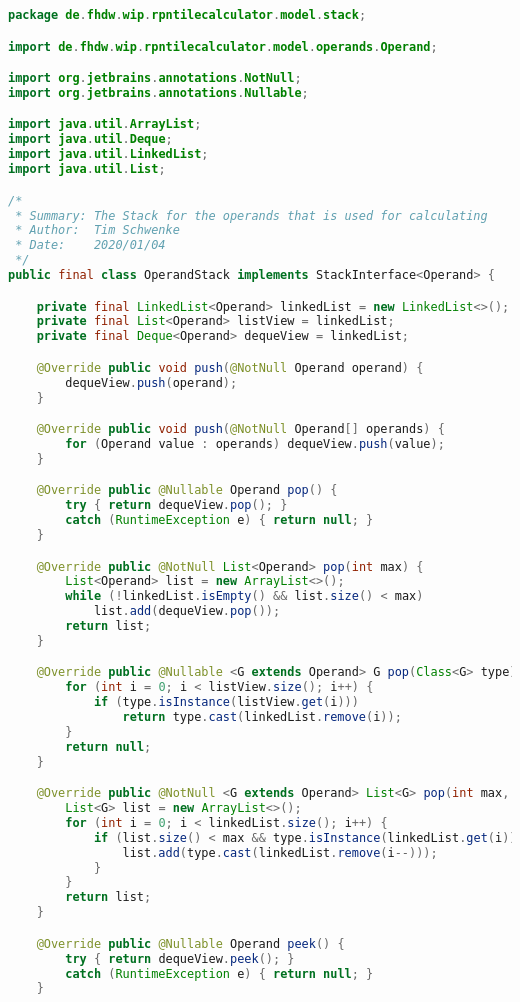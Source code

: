 \begin{lstlisting}[caption=OperandStack (Schwenke),label=list:OperandStack,language=Java]
package de.fhdw.wip.rpntilecalculator.model.stack;

import de.fhdw.wip.rpntilecalculator.model.operands.Operand;

import org.jetbrains.annotations.NotNull;
import org.jetbrains.annotations.Nullable;

import java.util.ArrayList;
import java.util.Deque;
import java.util.LinkedList;
import java.util.List;

/*
 * Summary: The Stack for the operands that is used for calculating
 * Author:  Tim Schwenke
 * Date:    2020/01/04
 */
public final class OperandStack implements StackInterface<Operand> {

    private final LinkedList<Operand> linkedList = new LinkedList<>();
    private final List<Operand> listView = linkedList;
    private final Deque<Operand> dequeView = linkedList;

    @Override public void push(@NotNull Operand operand) {
        dequeView.push(operand);
    }

    @Override public void push(@NotNull Operand[] operands) {
        for (Operand value : operands) dequeView.push(value);
    }

    @Override public @Nullable Operand pop() {
        try { return dequeView.pop(); }
        catch (RuntimeException e) { return null; }
    }

    @Override public @NotNull List<Operand> pop(int max) {
        List<Operand> list = new ArrayList<>();
        while (!linkedList.isEmpty() && list.size() < max)
            list.add(dequeView.pop());
        return list;
    }

    @Override public @Nullable <G extends Operand> G pop(Class<G> type) {
        for (int i = 0; i < listView.size(); i++) {
            if (type.isInstance(listView.get(i)))
                return type.cast(linkedList.remove(i));
        }
        return null;
    }

    @Override public @NotNull <G extends Operand> List<G> pop(int max, Class<G> type) {
        List<G> list = new ArrayList<>();
        for (int i = 0; i < linkedList.size(); i++) {
            if (list.size() < max && type.isInstance(linkedList.get(i))) {
                list.add(type.cast(linkedList.remove(i--)));
            }
        }
        return list;
    }

    @Override public @Nullable Operand peek() {
        try { return dequeView.peek(); }
        catch (RuntimeException e) { return null; }
    }


\end{lstlisting}
